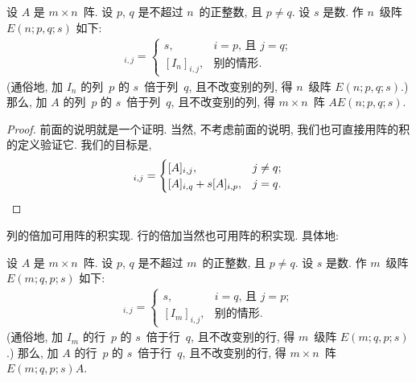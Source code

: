 \documentclass[../libro.tex]{subfiles}
\begin{document}
\begin{theorem}
    设 \(A\) 是 \(m \times n\)~阵.
    设 \(p\), \(q\) 是不超过 \(n\)~的正整数,
    且 \(p \neq q\).
    设 \(s\) 是数.
    作 \(n\)~级阵 \(E(n; p, q; s)\) 如下:
    \begin{align*}
        [E(n; p, q; s)]_{i,j} =
        \begin{cases}
            s,           & \text{\(i = p\), 且 \(j = q\)}; \\
            [I_n]_{i,j}, & \text{别的情形}.
        \end{cases}
    \end{align*}
    (通俗地, %
    加 \(I_n\) 的列~\(p\) 的 \(s\)~倍于列~\(q\),
    且不改变别的列, 得 \(n\)~级阵 \(E(n; p, q; s)\).) %
    那么,
    加 \(A\) 的列~\(p\) 的 \(s\)~倍于列~\(q\),
    且不改变别的列, 得 \(m \times n\)~阵 \(A E(n; p, q; s)\).
\end{theorem}

\begin{proof}
    前面的说明就是一个证明.
    当然, 不考虑前面的说明, 我们也可直接用阵的积的定义验证它.
    我们的目标是,
    \begin{equation*}
        [A E(n; p, q; s)]_{i,j} =
        \begin{cases}
            [A]_{i,j},              & j \neq q; \\
            [A]_{i,q} + s[A]_{i,p}, & j = q.
        \end{cases}
        \qedhere
    \end{equation*}
\end{proof}

列的倍加可用阵的积实现.
行的倍加当然也可用阵的积实现.
具体地:

\begin{theorem}
    设 \(A\) 是 \(m \times n\)~阵.
    设 \(p\), \(q\) 是不超过 \(m\)~的正整数,
    且 \(p \neq q\).
    设 \(s\) 是数.
    作 \(m\)~级阵 \(E(m; q, p; s)\) 如下:
    \begin{align*}
        [E(m; q, p; s)]_{i,j} =
        \begin{cases}
            s,           & \text{\(i = q\), 且 \(j = p\)}; \\
            [I_m]_{i,j}, & \text{别的情形}.
        \end{cases}
    \end{align*}
    (通俗地, %
    加 \(I_m\) 的行~\(p\) 的 \(s\)~倍于行~\(q\),
    且不改变别的行, 得 \(m\)~级阵 \(E(m; q, p; s)\).) %
    那么,
    加 \(A\) 的行~\(p\) 的 \(s\)~倍于行~\(q\),
    且不改变别的行, 得 \(m \times n\)~阵 \(E(m; q, p; s) A\).
\end{theorem}
\end{document}
